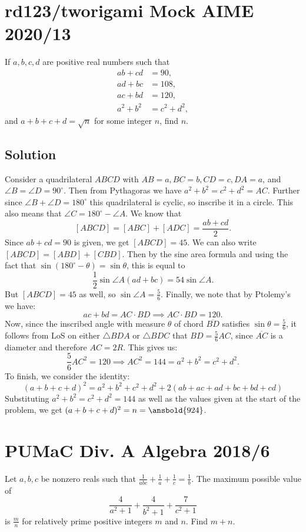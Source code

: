 \documentclass{article}
\begin{document}
\pagebreak\section{rd123/tworigami Mock AIME 2020/13}
If $a,b,c,d$ are positive real numbers such that
\begin{align*} ab + cd &= 90, \\ ad + bc &= 108, \\ ac + bd &= 120, \\ a^2+b^2 &= c^2+d^2, \end{align*}and $a+b+c+d=\sqrt{n}$ for some integer $n$, find $n$.

\subsection{Solution}
Consider a quadrilateral $ABCD$ with $AB=a,BC=b,CD=c,DA=a$, and $\angle B=\angle D=90^\circ$. Then from Pythagoras we have $a^2+b^2=c^2+d^2=AC$. Further since $\angle B+\angle D=180^\circ$ this quadrilateral is cyclic, so inscribe it in a circle. This also means that $\angle C=180^\circ-\angle A$. We know that
$$[ABCD]=[ABC]+[ADC]=\frac{ab+cd}{2}.$$
Since $ab+cd=90$ is given, we get $[ABCD]=45$. We can also write $[ABCD]=[ABD]+[CBD]$. Then by the sine area formula and using the fact that $\sin(180^\circ - \theta) = \sin \theta$, this is equal to
$$\frac{1}{2}\sin \angle A (ad+bc)=54 \sin \angle A.$$
But $[ABCD]=45$ as well, so $\sin \angle A=\frac{5}{6}$. Finally, we note that by Ptolemy's we have:
$$ac+bd=AC\cdot BD \implies AC \cdot BD=120.$$
Now, since the inscribed angle with measure $\theta$ of chord $\overline{BD}$ satisfies $\sin \theta = \frac{5}{6}$, it follows from LoS on either $\triangle BDA$ or $\triangle BDC$ that $BD=\frac{5}{6}AC$, since $\overline{AC}$ is a diameter and therefore $AC=2R$. This gives us:
$$\frac{5}{6}AC^2=120 \implies AC^2=144=a^2+b^2=c^2+d^2.$$
To finish, we consider the identity:
$$(a+b+c+d)^2=a^2+b^2+c^2+d^2+2(ab+ac+ad+bc+bd+cd)$$
Substituting $a^2+b^2=c^2+d^2=144$ as well as the values given at the start of the problem, we get $(a+b+c+d)^2=n=\ansbold{924}$.

\pagebreak\section{PUMaC Div. A Algebra 2018/6}
Let $a,b,c$ be nonzero reals such that $\frac{1}{abc}+\frac{1}{a}+\frac{1}{c}=\frac{1}{b}.$ The maximum possible value of $$\frac{4}{a^2+1}+\frac{4}{b^2+1}+\frac{7}{c^2+1}$$ is $\frac{m}{n}$ for relatively prime positive integers $m$ and $n.$ Find $m+n.$
\end{document}

